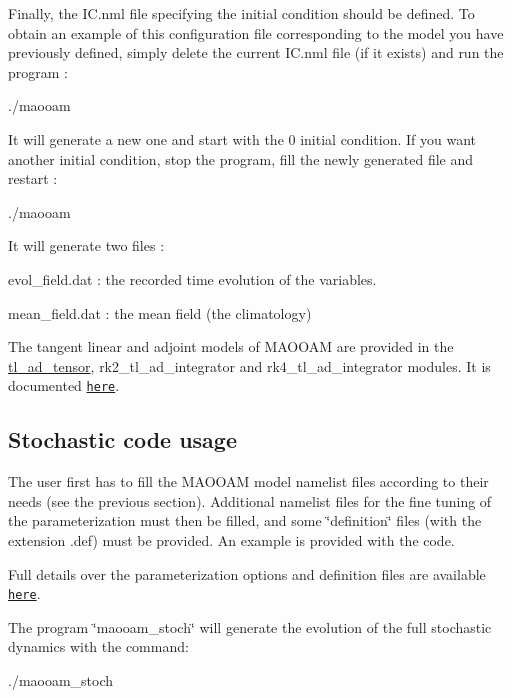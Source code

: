 Finally, the I\+C.\+nml file specifying the initial condition should be defined. To obtain an example of this configuration file corresponding to the model you have previously defined, simply delete the current I\+C.\+nml file (if it exists) and run the program \+: \begin{DoxyVerb}./maooam
\end{DoxyVerb}


It will generate a new one and start with the 0 initial condition. If you want another initial condition, stop the program, fill the newly generated file and restart \+: \begin{DoxyVerb}./maooam
\end{DoxyVerb}


It will generate two files \+:
\begin{DoxyItemize}
\item evol\+\_\+field.\+dat \+: the recorded time evolution of the variables.
\item mean\+\_\+field.\+dat \+: the mean field (the climatology)
\end{DoxyItemize}

The tangent linear and adjoint models of M\+A\+O\+O\+AM are provided in the \hyperlink{namespacetl__ad__tensor}{tl\+\_\+ad\+\_\+tensor}, rk2\+\_\+tl\+\_\+ad\+\_\+integrator and rk4\+\_\+tl\+\_\+ad\+\_\+integrator modules. It is documented \href{./md_tl_ad_doc.html}{\tt here}. 



\subsection*{Stochastic code usage}

The user first has to fill the M\+A\+O\+O\+AM model namelist files according to their needs (see the previous section). Additional namelist files for the fine tuning of the parameterization must then be filled, and some \char`\"{}definition\char`\"{} files (with the extension .def) must be provided. An example is provided with the code.

Full details over the parameterization options and definition files are available \href{md_sto_doc.html}{\tt here}.

The program \char`\"{}maooam\+\_\+stoch\char`\"{} will generate the evolution of the full stochastic dynamics with the command\+: \begin{DoxyVerb}./maooam_stoch
\end{DoxyVerb}


